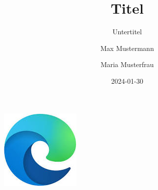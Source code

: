 \documentclass[
  11pt,
]{scrbook}
\title{Titel}
\subtitle{Untertitel}
\author{Max Mustermann \and Maria Musterfrau}
\date{2024-01-30}
\begin{document}
  \begin{frontmatter}
  \begin{titlepage}



  	\newcommand{\HRule}{\rule{\linewidth}{0.5mm}} %
  	
  	\center %
  	
  	\includegraphics{logo.jpeg}
  	
  	

\end{titlepage}
\end{frontmatter}
\end{document}
